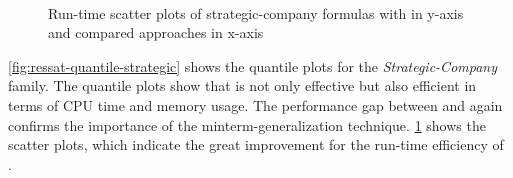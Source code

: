 \begin{figure}[hp]
    \centering
    \\
    \caption{Run-time scatter plots of strategic-company formulas with \ressat in y-axis and compared approaches in x-axis}
    \label{fig:ressat-scatter-strategic}
\end{figure}

\cref{fig:ressat-quantile-strategic} shows the quantile plots for the \textit{Strategic-Company} family.
The quantile plots show that \ressat is not only effective but also efficient
in terms of CPU time and memory usage.
The performance gap between \ressat and \ressatb again confirms the importance of the minterm-generalization technique.
\cref{fig:ressat-scatter-strategic} shows the scatter plots,
which indicate the great improvement for the run-time efficiency of \ressat.

